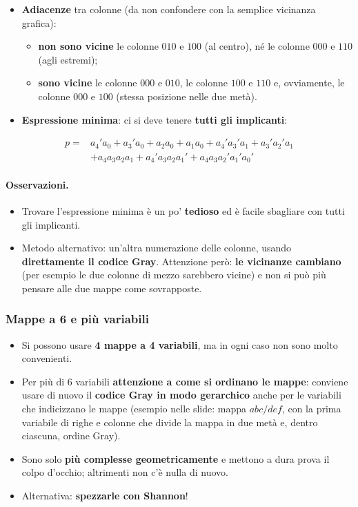 \documentclass[12pt, a4paper]{article}
\begin{document}
\begin{itemize}
    \item \textbf{Adiacenze} tra colonne (da non confondere con la semplice vicinanza grafica):
    \begin{itemize}
        \item \textcolor{red!80!black}{\textbf{non sono vicine}} le colonne $010$ e $100$ (al centro), né le colonne $000$ e $110$ (agli estremi);
        \item \textcolor{green!50!black}{\textbf{sono vicine}} le colonne $000$ e $010$, le colonne $100$ e $110$ e, ovviamente, le colonne $000$ e $100$ (stessa posizione nelle due metà).
    \end{itemize}
    \item \textbf{Espressione minima}: ci si deve tenere \textbf{tutti gli implicanti}:
\end{itemize}
\begin{align*}
p = {} & a_4'a_0 + a_3'a_0 + a_2a_0 + a_1a_0 + a_4'a_3'a_1 + a_3'a_2'a_1 \\
 & + a_4a_3a_2a_1 + a_4'a_3a_2a_1' + a_4a_3a_2'a_1'a_0'
\end{align*}

\paragraph{Osservazioni.}
\begin{itemize}
    \item Trovare l'espressione minima è un po' \textbf{tedioso} ed è facile sbagliare con tutti gli implicanti.
    \item Metodo alternativo: un'altra numerazione delle colonne, usando \textbf{direttamente il codice Gray}. Attenzione però: \textbf{le vicinanze cambiano} (per esempio le due colonne di mezzo sarebbero vicine) e non si può più pensare alle due mappe come sovrapposte.
\end{itemize}

\subsubsection{Mappe a 6 e più variabili}
\begin{itemize}
    \item Si possono usare \textbf{4 mappe a 4 variabili}, ma in ogni caso non sono molto convenienti.
    \item Per più di 6 variabili \textbf{attenzione a come si ordinano le mappe}: conviene usare di nuovo il \textbf{codice Gray in modo gerarchico} anche per le variabili che indicizzano le mappe (esempio nelle slide: mappa $abc/def$, con la prima variabile di righe e colonne che divide la mappa in due metà e, dentro ciascuna, ordine Gray).
    \item Sono solo \textbf{più complesse geometricamente} e mettono a dura prova il colpo d'occhio; altrimenti non c'è nulla di nuovo.
    \item Alternativa: \textcolor{blue!70!black}{\textbf{spezzarle con Shannon}}!
\end{itemize}
\end{document}
